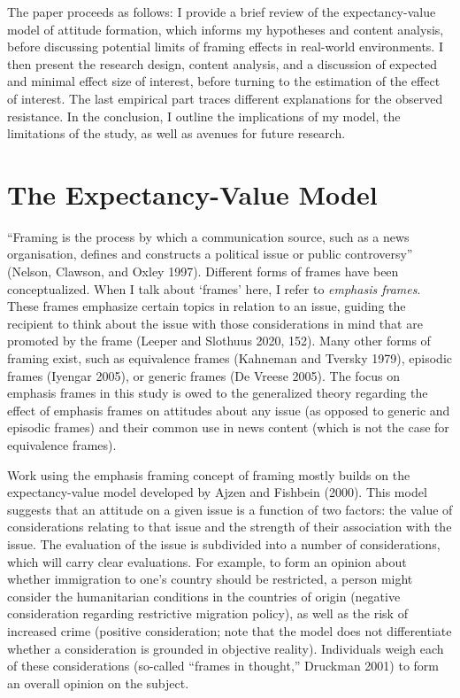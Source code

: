 \documentclass[
  12pt,
]{article}
\begin{document}
The paper proceeds as follows: I provide a brief review of the expectancy-value model of attitude formation, which informs my hypotheses and content analysis, before discussing potential limits of framing effects in real-world environments. I then present the research design, content analysis, and a discussion of expected and minimal effect size of interest, before turning to the estimation of the effect of interest. The last empirical part traces different explanations for the observed resistance. In the conclusion, I outline the implications of my model, the limitations of the study, as well as avenues for future research.

\hypertarget{framing-effects}{%
\section{The Expectancy-Value Model}\label{framing-effects}}

``Framing is the process by which a communication source, such as a news organisation, defines and constructs a political issue or public controversy'' (Nelson, Clawson, and Oxley 1997). Different forms of frames have been conceptualized. When I talk about `frames' here, I refer to \emph{emphasis frames}. These frames emphasize certain topics in relation to an issue, guiding the recipient to think about the issue with those considerations in mind that are promoted by the frame (Leeper and Slothuus 2020, 152). Many other forms of framing exist, such as equivalence frames (Kahneman and Tversky 1979), episodic frames (Iyengar 2005), or generic frames (De Vreese 2005). The focus on emphasis frames in this study is owed to the generalized theory regarding the effect of emphasis frames on attitudes about any issue (as opposed to generic and episodic frames) and their common use in news content (which is not the case for equivalence frames).

Work using the emphasis framing concept of framing mostly builds on the expectancy-value model developed by Ajzen and Fishbein (2000). This model suggests that an attitude on a given issue is a function of two factors: the value of considerations relating to that issue and the strength of their association with the issue. The evaluation of the issue is subdivided into a number of considerations, which will carry clear evaluations. For example, to form an opinion about whether immigration to one's country should be restricted, a person might consider the humanitarian conditions in the countries of origin (negative consideration regarding restrictive migration policy), as well as the risk of increased crime (positive consideration; note that the model does not differentiate whether a consideration is grounded in objective reality). Individuals weigh each of these considerations (so-called ``frames in thought,'' Druckman 2001) to form an overall opinion on the subject.
\end{document}
